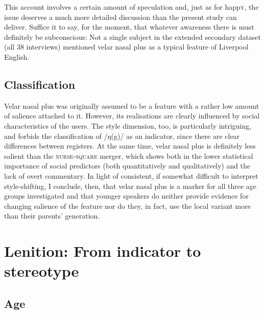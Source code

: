 This account involves a certain amount of speculation and, just as for happ\textsc{y}, the issue deserves a much more detailed discussion than the present study can deliver.
Suffice it to say, for the moment, that whatever awareness there is must definitely be subconscious: Not a single subject in the extended secondary dataset (all 38 interviews) mentioned velar nasal plus as a typical feature of Liverpool English.

\subsection{Classification}
\label{prod.disc.ng.classification}

Velar nasal plus was originally assumed to be a feature with a rather low amount of salience attached to it.
However, its realisations are clearly influenced by social characteristics of the users.
The style dimension, too, is particularly intriguing, and forbids the classification of /ŋ(g)/ as an indicator, since there are clear differences between registers.
At the same time, velar nasal plus is definitely less salient than the \textsc{nurse}-\textsc{square} merger, which shows both in the lower statistical importance of social predictors (both quantitatively and qualitatively) and the lack of overt commentary.
In light of consistent, if somewhat difficult to interpret style-shifting, I conclude, then, that velar nasal plus is a marker for all three age groups investigated and that younger speakers do neither provide evidence for changing salience of the feature nor do they, in fact, use the local variant more than their parents' generation.

\section{Lenition: From indicator to stereotype}
\label{prod.disc.k}

\subsection{Age}
\label{prod.disc.k.age}

